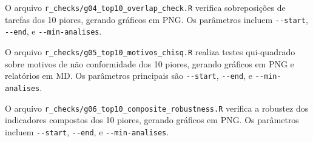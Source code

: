 \documentclass[11pt]{article}
\begin{document}
O arquivo \texttt{r\_checks/g04\_top10\_overlap\_check.R} verifica sobreposições de tarefas dos 10 piores, gerando gráficos em PNG. Os parâmetros incluem \texttt{-{}-start}, \texttt{-{}-end}, e \texttt{-{}-min-analises}.

O arquivo \texttt{r\_checks/g05\_top10\_motivos\_chisq.R} realiza testes qui-quadrado sobre motivos de não conformidade dos 10 piores, gerando gráficos em PNG e relatórios em MD. Os parâmetros principais são \texttt{-{}-start}, \texttt{-{}-end}, e \texttt{-{}-min-analises}.

O arquivo \texttt{r\_checks/g06\_top10\_composite\_robustness.R} verifica a robustez dos indicadores compostos dos 10 piores, gerando gráficos em PNG. Os parâmetros incluem \texttt{-{}-start}, \texttt{-{}-end}, e \texttt{-{}-min-analises}.
\end{document}
